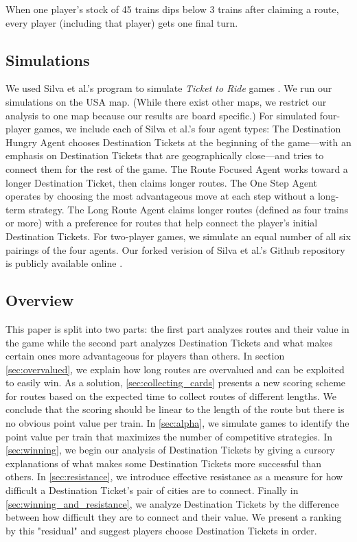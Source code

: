 When one player's stock of 45 trains dips 
below 3 trains after claiming a route,
every player (including that player) gets one final turn.

\subsection{Simulations}
We used Silva et al.'s program to simulate
\textit{Ticket to Ride} games \cite{silva2019}.
We run our simulations on the USA map.
(While there exist other maps, we restrict our analysis
to one map because our results are board specific.)
For simulated four-player games, we include each of 
Silva et al.'s four agent types:
The Destination Hungry Agent chooses 
Destination Tickets at the beginning of the
game---with an emphasis on Destination 
Tickets that are geographically close---and 
tries to connect them 
for the rest of the game.
The Route Focused Agent works toward 
a longer Destination Ticket, then claims longer routes.
The One Step Agent operates by choosing 
the most advantageous move at each
step without a long-term strategy.
The Long Route Agent claims 
longer routes (defined as four trains or more)
with a preference for routes that help 
connect the player's initial Destination Tickets.
For two-player games, we simulate an equal number 
of all six pairings of the four agents.
Our forked verision of Silva et al.'s
Github repository is publicly available online
\cite{witter2019}.

\subsection{Overview}
This paper is split into two parts:
the first part analyzes routes and their value
in the game while the second part analyzes
Destination Tickets and what makes certain ones
more advantageous for players than others.
In section \cref{sec:overvalued}, we explain
how long routes are overvalued and can be exploited
to easily win.
As a solution, \cref{sec:collecting_cards} presents a new
scoring scheme for routes based on the expected time
to collect routes of different lengths.
We conclude that the scoring should be linear
to the length of the route but there is no obvious
point value per train.
In \cref{sec:alpha}, we simulate games to identify
the point value per train that maximizes the 
number of competitive strategies.
In \cref{sec:winning}, we begin our analysis 
of Destination Tickets by giving a cursory
explanations of what makes some Destination Tickets 
more successful than others.
In \cref{sec:resistance}, we introduce effective
resistance as a measure for how difficult a Destination
Ticket's pair of cities are to connect.
Finally in \cref{sec:winning_and_resistance},
we analyze Destination Tickets by the difference 
between how difficult they are to connect and their value.
We present a ranking by this "residual" and suggest 
players choose Destination Tickets in order.
